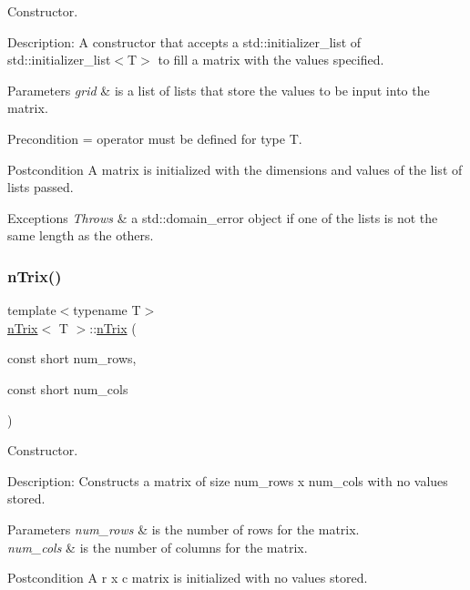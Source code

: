 Constructor. 

Description\+: A constructor that accepts a std\+::initializer\+\_\+list of std\+::initializer\+\_\+list$<$\+T$>$ to fill a matrix with the values specified. 
\begin{DoxyParams}{Parameters}
{\em grid} & is a list of lists that store the values to be input into the matrix. \\
\hline
\end{DoxyParams}
\begin{DoxyPrecond}{Precondition}
= operator must be defined for type T. 
\end{DoxyPrecond}
\begin{DoxyPostcond}{Postcondition}
A matrix is initialized with the dimensions and values of the list of lists passed. 
\end{DoxyPostcond}

\begin{DoxyExceptions}{Exceptions}
{\em Throws} & a std\+::domain\+\_\+error object if one of the lists is not the same length as the others. \\
\hline
\end{DoxyExceptions}
\mbox{\label{classnTrix_ac0b8db0c386024c87d57b8c0e3a31c65}} 
\subsubsection{\texorpdfstring{n\+Trix()}{nTrix()}\hspace{0.1cm}{\footnotesize\ttfamily [3/5]}}
{\footnotesize\ttfamily template$<$typename T$>$ \\
\hyperlink{classnTrix}{n\+Trix}$<$ T $>$\+::\hyperlink{classnTrix}{n\+Trix} (\begin{DoxyParamCaption}\item[{const short}]{num\+\_\+rows,  }\item[{const short}]{num\+\_\+cols }\end{DoxyParamCaption})}



Constructor. 

Description\+: Constructs a matrix of size num\+\_\+rows x num\+\_\+cols with no values stored. 
\begin{DoxyParams}{Parameters}
{\em num\+\_\+rows} & is the number of rows for the matrix. \\
\hline
{\em num\+\_\+cols} & is the number of columns for the matrix. \\
\hline
\end{DoxyParams}
\begin{DoxyPostcond}{Postcondition}
A r x c matrix is initialized with no values stored. 
\end{DoxyPostcond}

